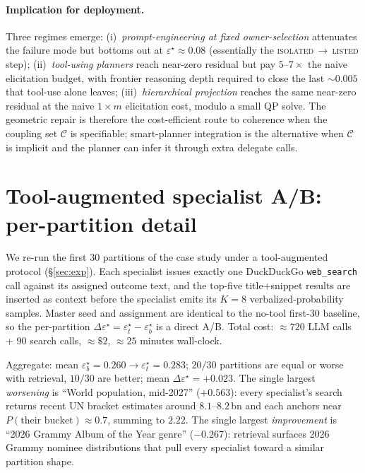 \documentclass{article}
\theoremstyle{plain}
\theoremstyle{definition}
\theoremstyle{remark}
\newcommand{\Cset}{\mathcal{C}}
\newcommand{\eps}{\varepsilon}
\begin{document}
\paragraph{Implication for deployment.}
Three regimes emerge: (i)~\emph{prompt-engineering at fixed
owner-selection} attenuates the failure mode but bottoms out at
$\eps^\star\!\approx\!0.08$ (essentially the
\textsc{isolated}\,$\to$\,\textsc{listed} step); (ii)~\emph{tool-using
planners} reach near-zero residual but pay $5$--$7\!\times$ the naive
elicitation budget, with frontier reasoning depth required to close
the last $\sim\!0.005$ that tool-use alone leaves; (iii)~\emph{hierarchical
projection} reaches the same near-zero residual at the naive
$1\!\times\!m$ elicitation cost, modulo a small QP solve. The
geometric repair is therefore the cost-efficient route to coherence
when the coupling set $\Cset$ is specifiable; smart-planner
integration is the alternative when $\Cset$ is implicit and the
planner can infer it through extra delegate calls.

\section{Tool-augmented specialist A/B: per-partition detail}
\label{app:toolaug}

We re-run the first $30$ partitions of the case study under a
tool-augmented protocol (\S\ref{sec:exp}). Each specialist
issues exactly one DuckDuckGo \texttt{web\_search} call against
its assigned outcome text, and the top-five title+snippet results
are inserted as context before the specialist emits its $K{=}8$
verbalized-probability samples. Master seed and assignment are
identical to the no-tool first-$30$ baseline, so the per-partition
$\Delta\eps^\star = \eps^\star_t - \eps^\star_b$ is a direct A/B.
Total cost: $\approx\!720$ LLM calls + $90$ search calls,
$\approx\!\$2$, $\approx\!25$ minutes wall-clock.

Aggregate: mean $\eps^\star_b = 0.260 \to \eps^\star_t = 0.283$;
$20/30$ partitions are equal or worse with retrieval, $10/30$ are
better; mean $\Delta\eps^\star = +0.023$. The single largest
\emph{worsening} is ``World population, mid-2027'' ($+0.563$):
every specialist's search returns recent UN bracket estimates
around $8.1$--$8.2$\,bn and each anchors near
$P(\text{their bucket}){\approx}0.7$, summing to $2.22$. The
single largest \emph{improvement} is ``2026 Grammy Album of the
Year genre'' ($-0.267$): retrieval surfaces 2026 Grammy nominee
distributions that pull every specialist toward a similar
partition shape.
\end{document}
